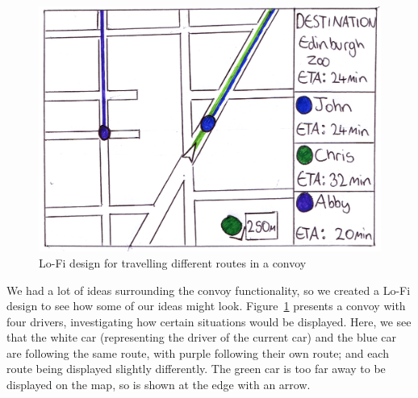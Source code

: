 \documentclass{article}
\begin{document}
\begin{figure}[H]
  \centering
  \includegraphics[scale=0.5]{convoy-lofi}
  \caption{Lo-Fi design for travelling different routes in a convoy}\label{convoy-lofi}
\end{figure}
We had a lot of ideas surrounding the convoy functionality, so we created a Lo-Fi design to see how some of our ideas might look. Figure~\ref{convoy-lofi} presents a convoy with four drivers, investigating how certain situations would be displayed. Here, we see that the white car (representing the driver of the current car) and the blue car are following the same route, with purple following their own route; and each route being displayed slightly differently. The green car is too far away to be displayed on the map, so is shown at the edge with an arrow.
\end{document}
